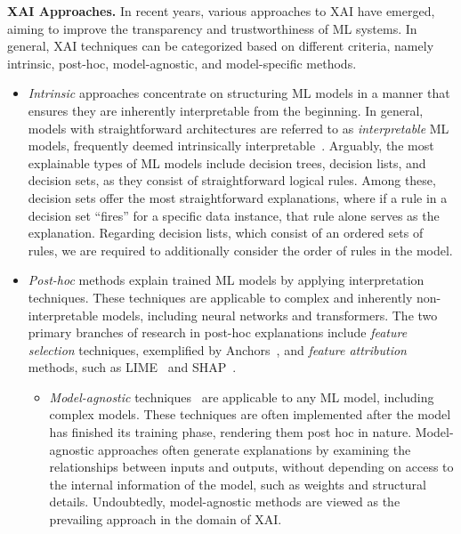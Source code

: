 \textbf{XAI Approaches.}
In recent years, various approaches to XAI have emerged, aiming to improve the 
transparency and trustworthiness of ML systems. 
%
In general, XAI techniques can be categorized based on different criteria,
namely intrinsic, post-hoc, model-agnostic, and model-specific methods.

\begin{itemize}
	\item \emph{Intrinsic} approaches concentrate on structuring ML models in a manner that 
		ensures they are inherently interpretable from the beginning.
		In general, models with straightforward architectures are referred to as
		\emph{interpretable} ML models, frequently deemed intrinsically interpretable~\cite{rudin-natmi19}.
		Arguably, the most explainable types of ML models include decision trees,
		decision lists, and decision sets, as they consist of straightforward logical rules.
		Among these, decision sets offer the most straightforward explanations,
		where if a rule in a decision set ``fires'' for a specific data instance, 
		that rule alone serves as the explanation.
		Regarding decision lists, which consist of an ordered sets of rules,
		we are required to additionally consider the order of rules in the model.

	\item \emph{Post-hoc} methods explain trained ML models by applying interpretation
		techniques.
		These techniques are applicable to complex and inherently non-interpretable models, 
		including neural networks and transformers.
		The two primary branches of research in post-hoc explanations include
		\emph{feature selection} techniques, exemplified by Anchors~\cite{guestrin-aaai18}, 
		and \emph{feature attribution} methods, such as LIME~\cite{guestrin-kdd16} and SHAP~\cite{lundberg-nips17}.

	\begin{itemize}
	\item \emph{Model-agnostic} techniques~\cite{guestrin-kdd16,lundberg-nips17,guestrin-aaai18} are 
		applicable to any ML model, including complex models.
		These techniques are often implemented after the model has finished its
		training phase, rendering them post hoc in nature.
		Model-agnostic approaches often generate explanations by examining 
		the relationships between inputs and outputs, without depending on access to 
		the internal information of the model, such as weights and structural details.
		Undoubtedly, model-agnostic methods are viewed as the prevailing approach 
		in the domain of XAI.
	

\end{itemize}
\end{itemize}
